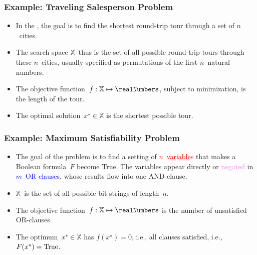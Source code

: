 \documentclass[aspectratio=169,mathserif,notheorems]{beamer}%
\gdef\searchSpace{\ensuremath{\mathbb{X}}}%
\gdef\sespel{\ensuremath{x}}%
\gdef\opti#1{\ensuremath{#1^{\star}}}%
\begin{document}
%
\begin{frame}%
\frametitle{Example: Traveling Salesperson Problem}%
\parbox{0.373\paperwidth}{%
\begin{itemize}%
%
\item In the \cite{ABCC2006TTSPACS,LLRKS1985TTSPAGTOCO,GP2002TTSPAIV,WCLTTCMY2014BOAAOSFFTTSP}, the goal is to find the shortest round-trip tour through a set of $n$~cities.%
%
\item<2-> The search space \searchSpace\ thus is the set of all possible round-trip tours through these $n$~cities, usually specified as permutations of the first $n$~natural numbers.%
%
\item<3-> The objective function~$f:\searchSpace\mapsto\realNumbers$, subject to minimization, is the length of the tour.%
%
\item<4-> The optimal solution~$\opti{\sespel}\in\searchSpace$ is the shortest possible tour.%
%
\end{itemize}%
}%
%
%
%
%
\end{frame}%
%
\begin{frame}%
\frametitle{Example: Maximum Satisfiability Problem}%
\parbox{0.42\paperwidth}{%
\begin{itemize}%
%
\item The goal of the \cite{HS2004SLSFAA,C1971TCOTPP} problem is to find a setting of \textcolor<2>{red}{$n$~variables} that makes a Boolean formula~$F$ become True. %
The variables appear directly or \textcolor<3>{violet}{negated} in \textcolor<4>{blue}{$m$~OR\nobreakdashes-clauses}, whose results flow into \textcolor<5>{green!40!black}{one AND\nobreakdashes-clause}.%
%
\item<6-> \searchSpace\ is the set of all possible bit strings of length~$n$.%
%
\item<7-> The objective function~$f:\searchSpace\mapsto\realNumbers$ is the number of unsatisfied OR\nobreakdashes-clauses.%
%
\item<8-> The optimum~$\opti{\sespel}\in\searchSpace$ has $f(\opti{\sespel})=0$, i.e., all clauses satisfied, i.e., $F(\opti{\sespel})=\textnormal{True}$.%
%
\end{itemize}%
}%
%
%
%
%
%
%
%
\end{frame}%
\end{document}
